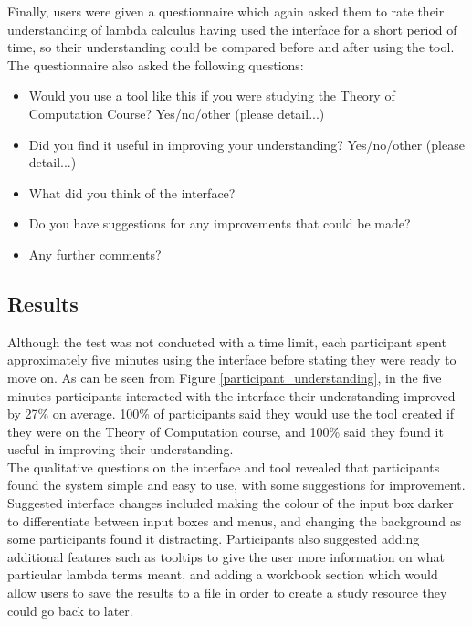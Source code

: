 \documentclass[a4paper,12pt]{report}
\begin{document}
Finally, users were given a questionnaire which again asked them to rate their understanding of lambda calculus having used the interface for a short period of time, so their understanding could be compared before and after using the tool.\\

The questionnaire also asked the following questions:
\begin{itemize}
	\item Would you use a tool like this if you were studying the Theory of Computation Course?
	\subitem Yes/no/other (please detail...)
	\item Did you find it useful in improving your understanding?
	\subitem Yes/no/other (please detail...)
	\item What did you think of the interface?
	\item Do you have suggestions for any improvements that could be made?
	\item Any further comments?
\end{itemize}

\subsection{Results}
Although the test was not conducted with a time limit, each participant spent approximately five minutes using the interface before stating they were ready to move on. As can be seen from Figure \ref{participant_understanding}, in the five minutes participants interacted with the interface their understanding improved by 27\% on average. 100\% of participants said they would use the tool created if they were on the Theory of Computation course, and 100\% said they found it useful in improving their understanding.\\

The qualitative questions on the interface and tool revealed that participants found the system simple and easy to use, with some suggestions for improvement. Suggested interface changes included making the colour of the input box darker to differentiate between input boxes and menus, and changing the background as some participants found it distracting. Participants also suggested adding additional features such as tooltips to give the user more information on what particular lambda terms meant, and adding a workbook section which would allow users to save the results to a file in order to create a study resource they could go back to later.\\
\end{document}
